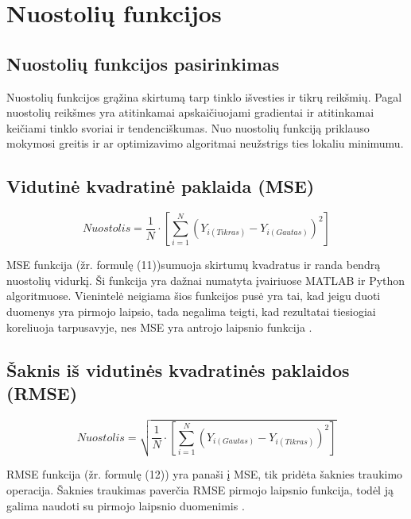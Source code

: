 \documentclass{VUMIFInfKursinis}
\begin{document}


\section{Nuostolių funkcijos}

\subsection{Nuostolių funkcijos pasirinkimas}

\par
Nuostolių funkcijos grąžina skirtumą tarp tinklo išvesties ir tikrų reikšmių. Pagal
nuostolių reikšmes yra atitinkamai apskaičiuojami gradientai ir atitinkamai
keičiami tinklo svoriai ir tendenciškumas. Nuo nuostolių funkciją priklauso
mokymosi greitis ir ar optimizavimo algoritmai neužstrigs ties lokaliu minimumu.

\subsection{Vidutinė kvadratinė paklaida (MSE)}
\begin{equation}
  Nuostolis = \frac{1}{N} \cdot [\sum_{i=1}^{N}(Y_{i (Tikras)}-Y_{i (Gautas)})^{2}]
\end{equation}
\par
MSE funkcija (žr. formulę (11))sumuoja skirtumų kvadratus ir randa bendrą nuostolių vidurkį.
Ši funkcija yra dažnai numatyta įvairiuose MATLAB ir Python algoritmuose.
Vienintelė neigiama šios funkcijos pusė yra tai, kad jeigu duoti duomenys yra pirmojo
laipsio, tada negalima teigti, kad rezultatai tiesiogiai koreliuoja tarpusavyje,
nes MSE yra antrojo laipsnio funkcija \cite{salt12}.

\subsection{Šaknis iš vidutinės kvadratinės paklaidos (RMSE)}
\begin{equation}
  Nuostolis = \sqrt{\frac{1}{N} \cdot [\sum_{i=1}^{N} (Y_{i (Gautas)}-Y_{i (Tikras)})^{2}]}
\end{equation}
\par
RMSE funkcija (žr. formulę (12)) yra panaši į MSE, tik pridėta šaknies traukimo operacija.
Šaknies traukimas paverčia RMSE pirmojo laipsnio funkcija, todėl ją galima naudoti
su pirmojo laipsnio duomenimis \cite{salt12}.
\end{document}
